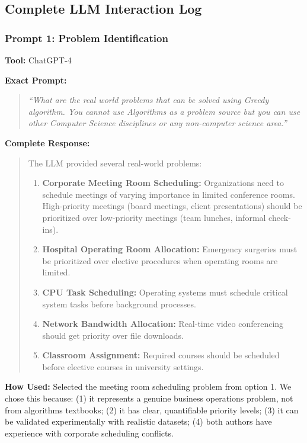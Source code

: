 \documentclass[conference]{IEEEtran}
\begin{document}
\subsection{Complete LLM Interaction Log}

\subsubsection{Prompt 1: Problem Identification}

\textbf{Tool:} ChatGPT-4

\textbf{Exact Prompt:}
\begin{quote}
\textit{``What are the real world problems that can be solved using Greedy algorithm. You cannot use Algorithms as a problem source but you can use other Computer Science disciplines or any non-computer science area.''}
\end{quote}

\textbf{Complete Response:}
\begin{quote}
\small
The LLM provided several real-world problems:
\begin{enumerate}
    \item \textbf{Corporate Meeting Room Scheduling:} Organizations need to schedule meetings of varying importance in limited conference rooms. High-priority meetings (board meetings, client presentations) should be prioritized over low-priority meetings (team lunches, informal check-ins).
    \item \textbf{Hospital Operating Room Allocation:} Emergency surgeries must be prioritized over elective procedures when operating rooms are limited.
    \item \textbf{CPU Task Scheduling:} Operating systems must schedule critical system tasks before background processes.
    \item \textbf{Network Bandwidth Allocation:} Real-time video conferencing should get priority over file downloads.
    \item \textbf{Classroom Assignment:} Required courses should be scheduled before elective courses in university settings.
\end{enumerate}
\end{quote}

\textbf{How Used:}
Selected the meeting room scheduling problem from option 1. We chose this because: (1) it represents a genuine business operations problem, not from algorithms textbooks; (2) it has clear, quantifiable priority levels; (3) it can be validated experimentally with realistic datasets; (4) both authors have experience with corporate scheduling conflicts.
\end{document}
